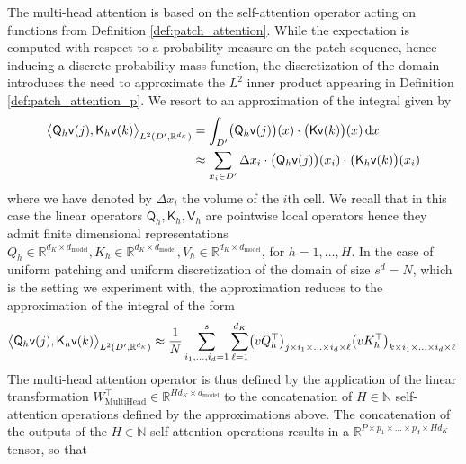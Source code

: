 \documentclass[twoside]{article}
\newcommand{\1}{\mathbbm{1}}
\newcommand{\R}{\mathbbm{R}}
\newcommand{\N}{\mathbbm{N}}
\newcommand{\sQ}{\mathsf{Q}}
\newcommand{\sK}{\mathsf{K}}
\newcommand{\sv}{\mathsf{v}}
\newcommand{\dK}{d_\textrm{\scalebox{.7}{$K$}}}
\newcommand{\sV}{\mathsf{V}}
\providecommand{\mathbbm}{\mathbb} %
\begin{document}
The multi-head attention is based on the self-attention operator acting on functions from Definition \ref{def:patch_attention}. While the expectation is computed with respect to a probability measure on the patch sequence, hence inducing a discrete probability mass function, the discretization of the domain introduces the need to approximate the $L^2$  inner product appearing in Definition \ref{def:patch_attention_p}. We resort to an approximation of the integral given by 
\begin{subequations}
\label{eq:MC_approx_L2_1}
\begin{align}
    \big\langle \sQ_h {\sv}(j), \sK_h {\sv}(k) \big\rangle_{L^2(D' ,\mathbb{R}^{\dK})} &= \int_{D'} \bigl(\sQ_h {\sv}(j)\bigr)(x) \cdot \bigl(\sK {\sv}(k)\bigr)(x) \,\mathrm{d}x\\
    &\approx \sum_{x_i\in D'} \Delta x_i\cdot\bigl(\sQ_h {\sv}(j)\bigr)(x_i) \cdot \bigl(\sK_h {\sv}(k)\bigr)(x_i)
\end{align}
\end{subequations}
where we have denoted %
by $\Delta x_i$ the volume of the $i$th cell. We recall that in this case the linear operators $\sQ_h,\sK_h,\sV_h$ are pointwise local operators hence they admit finite dimensional representations $Q_h\in \R^{d_K\times d_{\textrm{model}}},K_h\in \R^{d_K\times d_{\textrm{model}}},V_h\in \R^{d_K\times d_{\textrm{model}}}$, for $h=1,\ldots,H$. In the case of uniform patching and uniform discretization of the domain of size $s^d=N$, which is the setting we experiment with, the approximation reduces to the approximation of the integral of the form
\begin{equation}
\label{eq:MC_approx_L2_2}
    \big\langle \sQ_h {\sv}(j), \sK_h {\sv}(k) \big\rangle_{L^2(D' ,\mathbb{R}^{\dK})} \approx \frac{1}{N}  \sum_{i_1,\ldots,i_d=1}^s \sum_{\ell=1}^{d_K} \bigl( {v}Q_h^\top\bigr)_{j\times i_1\times\ldots\times i_d\times \ell}\bigl( {v}K_h^\top\bigr)_{k\times i_1\times\ldots\times i_d\times \ell}.
\end{equation}
The multi-head attention operator is thus defined by the application of the linear transformation $W_{\textrm{MultiHead}}^\top\in \R^{Hd_K\times d_{\textrm{model}} }$ to the concatenation of $H\in\N$ self-attention operations defined by the approximations above. The concatenation of the outputs of the $H\in\N$ self-attention operations results in a $\R^{P\times p_1\times \ldots\times p_d\times Hd_K}$ tensor, so that 
\end{document}
